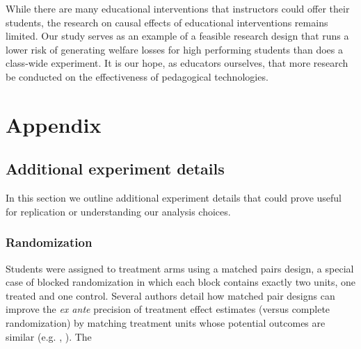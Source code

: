 \documentclass[12pt]{article}
\begin{document}
While there are many educational interventions that instructors could offer their students, the research on causal effects of educational interventions remains limited. Our study serves as an example of a feasible research design that runs a lower risk of generating welfare losses for high performing students than does a class-wide experiment. It is our hope, as educators ourselves, that more research be conducted on the effectiveness of pedagogical technologies.

\printbibliography


\clearpage


\clearpage


\clearpage


\clearpage


\clearpage


\clearpage






\clearpage

\section*{Appendix}

\renewcommand{\thesubsection}{\Alph{subsection}}

\setcounter{table}{0}
\renewcommand{\thetable}{A\arabic{table}}

\subsection{Additional experiment details}

In this section we outline additional experiment details that could prove useful for replication or understanding our analysis choices.

\subsubsection{Randomization} \label{a_randomization}
Students were assigned to treatment arms using a matched pairs design, a special case of blocked randomization in which each block contains exactly two units, one treated and one control. Several authors detail how matched pair designs can improve the \textit{ex ante} precision of treatment effect estimates (versus complete randomization) by matching treatment units whose potential outcomes are similar (e.g. \cite{ir2015}, \cite{ai2017}). The
\end{document}
